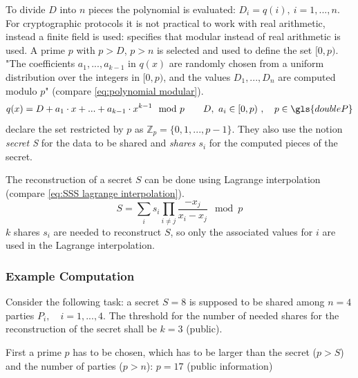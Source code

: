To divide $D$ into $n$ pieces the polynomial is evaluated: $D_i=q(i),\ i=1,...,n$. For cryptographic protocols it is not practical to work with real arithmetic, instead a finite field is used: \textcite{Shamir1979} specifies that modular instead of real arithmetic is used. A prime $p$ with $p>D$, $p>n$ is selected and used to define the set $[0, p)$. "The coefficients $a_1, ..., a_{k-1}$ in $q(x)$ are randomly chosen	from a uniform distribution over the integers in $[0, p)$, and the values $D_1, ..., D_n$ are computed modulo $p$" \autocite[p. 613]{Shamir1979} (compare \ref{eq:polynomial modular}).
\begin{equation}
\label{eq:polynomial modular}
q(x) = D + a_1 \cdot x + ... + a_{k-1} \cdot x^{k-1} \mod p \qquad D,\ a_i \in [0,p)\ , \quad p \in \gls{doubleP}
\end{equation}
\textcite[p. 7]{Cramer2015} declare the set restricted by $p$ as $\mathbb{Z}_p = \{0, 1, ..., p-1\}$. They also use the notion \textit{secret S} for the data to be shared and \textit{shares $s_i$} for the computed pieces of the secret.



The reconstruction of a secret $S$ can be done using Lagrange interpolation (compare \ref{eq:SSS lagrange interpolation}).
\begin{equation}
\label{eq:SSS lagrange interpolation}
S = \sum_i s_i \prod_{i \neq j} \frac{-x_j}{x_i-x_j} \mod p
\end{equation}
$k$ shares $s_i$ are needed to reconstruct $S$, so only the associated values for $i$ are used in the Lagrange interpolation.

\subsubsection*{Example Computation} \label{Example Computation}

Consider the following task: a secret $S=8$ is supposed to be shared among $n=4$ parties $P_i,\quad i=1,...,4$. The threshold for the number of needed shares for the reconstruction of the secret shall be $k=3$ (public).

First a prime $p$ has to be chosen, which has to be larger than the secret ($p>S$) and the number of parties ($p>n$): $p=17$ (public information)

